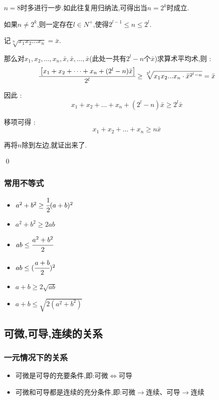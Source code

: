 {{{    $n = 8$时多进行一步.如此往复用归纳法,可得出当$n = 2^k$时成立.

    如果$n \neq 2^k$,则一定存在$l \in N^+$,使得$2^{l - 1} \leq n \leq 2^l$.

    记$\sqrt[n]{x_1x_2 \dots x_n} = \bar{x}$.

    那么对$x_1,x_2,\dots,x_n,\bar{x},\bar{x},\dots,\bar{x}$(此处一共有$2^l - n$个$\bar{x}$)求算术平均术,则 : $$
        \cfrac{\left[x_1+x_2+\dots+x_n+(2^l - n)\bar{x}\right]}{2^l} \geq \sqrt[2^l]{x_1x_2...x_n \cdot \bar{x}^{2^l - n}} = \bar{x}
    $$

    因此 : $$
        x_1 + x_2 + \dots + x_n + (2^l - n)\bar{x} \geq 2^l\bar{x}
    $$

    移项可得 : $$
        x_1 + x_2 + \dots + x_n \geq n\bar{x}
    $$

    再将$n$除到左边,就证出来了.

    \qed
}%

\subsubsection{常用不等式}{
    \begin{itemize}
        \item $a^2 + b^2 \geq \cfrac{1}{2}(a + b)^2$
        \item $a^2 + b^2 \geq 2ab$
        \item $ab \leq \cfrac{a^2 + b^2}{2}$
        \item $ab \leq (\cfrac{a + b}{2})^2$
        \item $a + b \geq 2\sqrt{ab}$
        \item $a + b \leq \sqrt{2(a^2 + b^2)}$
    \end{itemize}
}%

}%

\subsection{可微,可导,连续的关系}{

    \subsubsection{一元情况下的关系}{
        \begin{itemize}
            \item 可微是可导的充要条件,即:可微$\Leftrightarrow$可导
            \item 可微和可导都是连续的充分条件,即:可微$\rightarrow$连续、可导$\rightarrow$连续
        \end{itemize}

}}}
